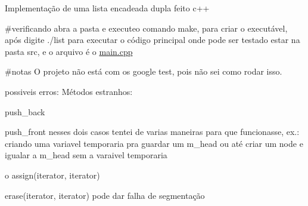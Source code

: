 Implementação de uma lista encadeada dupla feito c++

\#verificando abra a pasta e executeo comando make, para criar o executável, após digite ./list para executar o código principal onde pode ser testado estar na pasta src, e o arquivo é o \hyperlink{main_8cpp}{main.\+cpp}

\#notas O projeto não está com os google test, pois não sei como rodar isso.

possiveis erros\+: Métodos estranhos\+:
\begin{DoxyItemize}
\item push\+\_\+back
\item push\+\_\+front nesses dois casos tentei de varias maneiras para que funcionasse, ex.\+: criando uma variavel temporaria pra guardar um m\+\_\+head ou até criar um node e igualar a m\+\_\+head sem a varaivel temporaria
\item o assign(iterator, iterator)
\item erase(iterator, iterator) pode dar falha de segmentação 
\end{DoxyItemize}